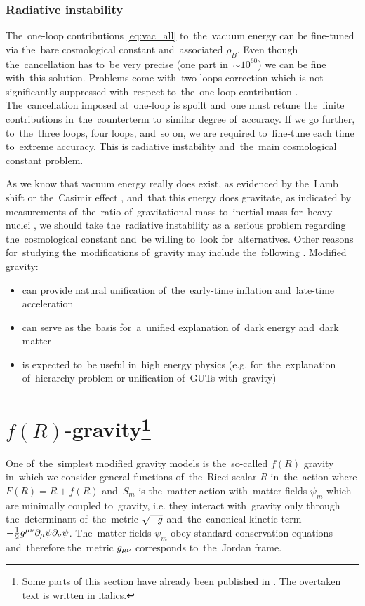 \subsubsection{Radiative instability}
The~one-loop contributions \eqref{eq:vac_all} to~the~vacuum energy can be fine-tuned via the~bare cosmological constant and~associated $\rho_B$. Even though the~cancellation has to~be very precise (one part in~$\sim10^{60}$) we can be fine with~this solution. Problems come with~two-loops correction which is not significantly suppressed with~respect to~the~one-loop contribution \parencite{2012CRPhy..13..566M}. The~cancellation imposed at~one-loop is spoilt and~one must retune the~finite contributions in~the~counterterm to~similar degree of~accuracy. If we go further, to~the~three loops, four loops, and~so on, we are required to~fine-tune each time to~extreme accuracy. This is radiative instability and~the~main cosmological constant problem.

As we know that vacuum energy really does exist, as evidenced by the~Lamb shift \parencite{2020Physi...2..105M} or the~Casimir effect \parencite{2006BrJPh..36.1137F}, and~that this energy does gravitate, as indicated by measurements of~the~ratio of~gravitational mass to~inertial mass for~heavy nuclei \parencite{Braginskii:1971tn}, we should take the~radiative instability as a~serious problem regarding the~cosmological constant and~be willing to~look for~alternatives. Other reasons for~studying the~modifications of~gravity may include the~following \parencite{2006hep.th....1213N}. Modified gravity:
\begin{itemize}
	\item can provide natural unification of~the~early-time inflation and~late-time acceleration
	\item can serve as the~basis for~a~unified explanation of~dark energy and~dark matter
	\item is expected to~be useful in~high energy physics (e.g. for~the~explanation of~hierarchy problem or unification of~GUTs with~gravity)
\end{itemize} 
\section[$f(R)$-gravity]{$f(R)$-gravity\footnote{Some parts of this section have already been published in \textcite{mastersthesis_vrastil}. The overtaken text is written in italics.}}
\label{sec:fR}
One of~the~simplest modified gravity models is the~so-called $f(R)$ gravity in~which we consider general functions of~the~Ricci scalar $R$ in~the~action
where $F(R)=R+f(R)$ and~$S_m$ is the~matter action with~matter fields $\psi_m$ which are minimally coupled to~gravity, i.e. they interact with~gravity only through the~determinant of~the~metric $\sqrt{-g}$ and~the~canonical kinetic term $-\frac12g^{\mu\nu}\partial_\mu\psi\partial_\nu\psi$. The~matter fields $\psi_m$ obey standard conservation equations and~therefore the~metric $g_{\mu\nu}$ corresponds to~the~Jordan frame.

